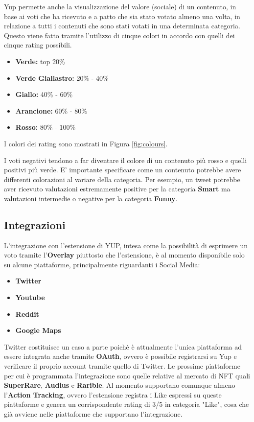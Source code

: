 Yup permette anche la visualizzazione del valore (sociale) di un contenuto, in base ai voti che ha ricevuto e a patto che sia stato votato almeno una volta, in relazione a tutti i contenuti che sono stati votati in una determinata categoria. Questo viene fatto tramite l'utilizzo di cinque colori in accordo con quelli dei cinque rating possibili.
\begin{itemize}
    \item \textbf{Verde:} top 20\%
    \item \textbf{Verde Giallastro:} 20\% - 40\%
    \item \textbf{Giallo:} 40\% - 60\%
    \item \textbf{Arancione:} 60\% - 80\%
    \item \textbf{Rosso:} 80\% - 100\%
\end{itemize}
I colori dei rating sono mostrati in Figura \ref{fig:colours}.

I voti negativi tendono a far diventare il colore di un contenuto più rosso e quelli positivi più verde. E' importante specificare come un contenuto potrebbe avere differenti colorazioni al variare della categoria. Per esempio, un tweet potrebbe aver ricevuto valutazioni estremamente positive per la categoria \textbf{Smart} ma valutazioni intermedie o negative per la categoria \textbf{Funny}.

\subsection{Integrazioni}
L'integrazione con l'estensione di YUP, intesa come la possibilità di esprimere un voto tramite l'\textbf{Overlay} piuttosto che l'estensione, è al momento disponibile solo su alcune piattaforme, principalmente riguardanti i Social Media:

\begin{itemize}
    \item \textbf{Twitter}
    \item \textbf{Youtube}
    \item \textbf{Reddit}
    \item \textbf{Google Maps}
\end{itemize}

Twitter costituisce un caso a parte poichè è attualmente l'unica piattaforma ad essere integrata anche tramite \textbf{OAuth}, ovvero è possibile registrarsi su Yup e verificare il proprio account tramite quello di Twitter.
Le prossime piattaforme per cui è programmata l'integrazione sono quelle relative al mercato di NFT quali \textbf{SuperRare}, \textbf{Audius} e \textbf{Rarible}. Al momento supportano comunque almeno l'\textbf{Action Tracking}, ovvero l'estensione registra i Like espressi su queste piattaforme e genera un corrispondente rating di 3/5 in categoria "Like", cosa che già avviene nelle piattaforme che supportano l'integrazione.

